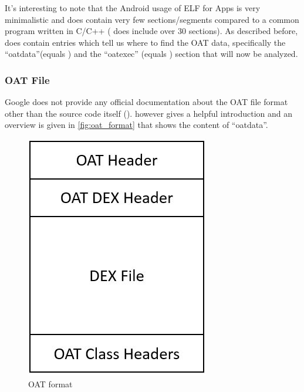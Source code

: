 It's interesting to note that the Android usage of ELF for Apps
is very minimalistic and does contain very few sections/segments
compared to a common program written in C/C++ (
does include over 30 sections). As described before,
 does contain entries which tell us where to find
the OAT data, specifically the ``oatdata''(equals )
and the ``oatexec'' (equals )
section that will now be analyzed.

\subsubsection{OAT File}\label{section:oat_file}
Google does not provide any official documentation about the OAT
file format other than the source code itself
(). \parencite{hiding_behind_art}
however gives a helpful introduction and an overview is given
in \autoref{fig:oat_format} that shows the content of ``oatdata''.

\begin{figure}[htb]
  \centering
  \includegraphics[scale=0.5]{figures/oat_format}
  \caption[OAT format]{OAT format}
  \label{fig:oat_format}
\end{figure}

